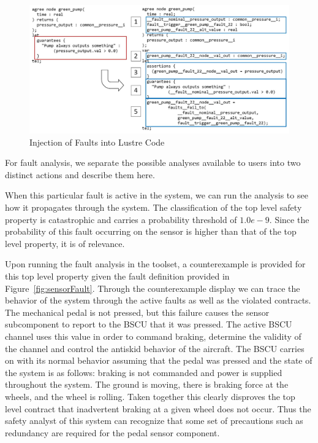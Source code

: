 \begin{figure}[h!]
	\hspace*{-2cm}
	\vspace{-0.3in} 
	\begin{center}
		\includegraphics[scale=0.3]{images/lustre.jpg}
		\caption{Injection of Faults into Lustre Code}
		\label{fig:lustre}
	\end{center}
	\vspace{-0.3in}
\end{figure}

For fault analysis, we separate the possible analyses available to users into two distinct actions and describe them here.

When this particular fault is active in the system, we can run the analysis to see how it propagates through the system. The classification of the top level safety property is catastrophic and carries a probability threshold of $1.0e-9$. Since the probability of this fault occurring on the sensor is higher than that of the top level property, it is of relevance. 

Upon running the fault analysis in the toolset, a counterexample is provided for this top level property given the fault definition provided in Figure~\ref{fig:sensorFault}. Through the counterexample display we can trace the behavior of the system through the active faults as well as the violated contracts. The mechanical pedal is not pressed, but this failure causes the sensor subcomponent to report to the BSCU that it was pressed. The active BSCU channel uses this value in order to command braking, determine the validity of the channel and control the antiskid behavior of the aircraft. The BSCU carries on with its normal behavior assuming that the pedal was pressed and the state of the system is as follows: braking is not commanded and power is supplied throughout the system. The ground is moving, there is braking force at the wheels, and the wheel is rolling. Taken together this clearly disproves the top level contract that inadvertent braking at a given wheel does not occur. Thus the safety analyst of this system can recognize that some set of precautions such as redundancy are required for the pedal sensor component. 

